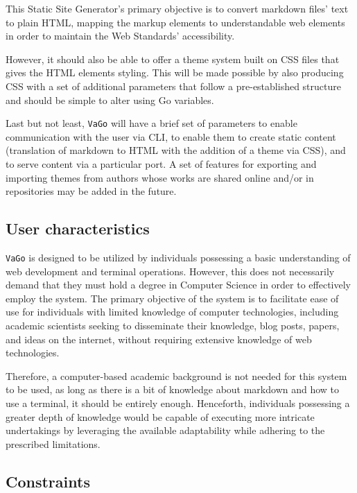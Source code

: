 This Static Site Generator's primary objective is to convert markdown
files' text to plain HTML, mapping the markup elements to understandable
web elements in order to maintain the Web Standards' accessibility\cite{accwai}\cite{basismoz}.

However, it should also be able to offer a theme system built on CSS
files that gives the HTML elements styling. This will be made possible
by also producing CSS with a set of additional parameters that follow a
pre-established structure and should be simple to alter using Go
variables.

Last but not least, \texttt{VaGo} will have a brief set of parameters to
enable communication with the user via CLI, to enable them to create
static content (translation of markdown to HTML with the addition of a
theme via CSS), and to serve content via a particular port. A set of
features for exporting and importing themes from authors whose works are
shared online and/or in repositories may be added in the future.

\subsection{User characteristics}\label{subsubsec:user-characteristics}

\texttt{VaGo} is designed to be utilized by individuals possessing a
basic understanding of web development and terminal operations. However,
this does not necessarily demand that they must hold a degree in
Computer Science in order to effectively employ the system. The primary
objective of the system is to facilitate ease of use for individuals
with limited knowledge of computer technologies, including academic
scientists seeking to disseminate their knowledge, blog posts, papers,
and ideas on the internet, without requiring extensive knowledge of web
technologies.

Therefore, a computer-based academic background is not needed for this
system to be used, as long as there is a bit of knowledge about markdown
and how to use a terminal, it should be entirely enough. Henceforth,
individuals possessing a greater depth of knowledge would be capable of
executing more intricate undertakings by leveraging the available
adaptability while adhering to the prescribed limitations.

\subsection{Constraints}\label{subsubsec:constraints}

